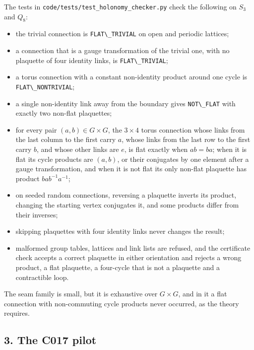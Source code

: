 \documentclass[
  11pt,
]{article}
\newcommand{\passthrough}[1]{#1}
\providecommand{\tightlist}{%
  \setlength{\itemsep}{0pt}\setlength{\parskip}{0pt}}
\begin{document}
The tests in \nolinkurl{code/tests/test_holonomy_checker.py} check the
following on \(S_3\) and \(Q_8\):

\begin{itemize}
\tightlist
\item
  the trivial connection is \passthrough{\lstinline!FLAT\_TRIVIAL!} on
  open and periodic lattices;
\item
  a connection that is a gauge transformation of the trivial one, with
  no plaquette of four identity links, is
  \passthrough{\lstinline!FLAT\_TRIVIAL!};
\item
  a torus connection with a constant non-identity product around one
  cycle is \passthrough{\lstinline!FLAT\_NONTRIVIAL!};
\item
  a single non-identity link away from the boundary gives
  \passthrough{\lstinline!NOT\_FLAT!} with exactly two non-flat
  plaquettes;
\item
  for every pair \((a,b) \in G \times G\), the \(3 \times 4\) torus
  connection whose links from the last column to the first carry \(a\),
  whose links from the last row to the first carry \(b\), and whose
  other links are \(e\), is flat exactly when \(ab = ba\); when it is
  flat its cycle products are \((a, b)\), or their conjugates by one
  element after a gauge transformation, and when it is not flat its only
  non-flat plaquette has product \(b a b^{-1} a^{-1}\);
\item
  on seeded random connections, reversing a plaquette inverts its
  product, changing the starting vertex conjugates it, and some products
  differ from their inverses;
\item
  skipping plaquettes with four identity links never changes the result;
\item
  malformed group tables, lattices and link lists are refused, and the
  certificate check accepts a correct plaquette in either orientation
  and rejects a wrong product, a flat plaquette, a four-cycle that is
  not a plaquette and a contractible loop.
\end{itemize}

The seam family is small, but it is exhaustive over \(G \times G\), and
in it a flat connection with non-commuting cycle products never
occurred, as the theory requires.

\subsection{3. The C017 pilot}\label{the-c017-pilot}
\end{document}
